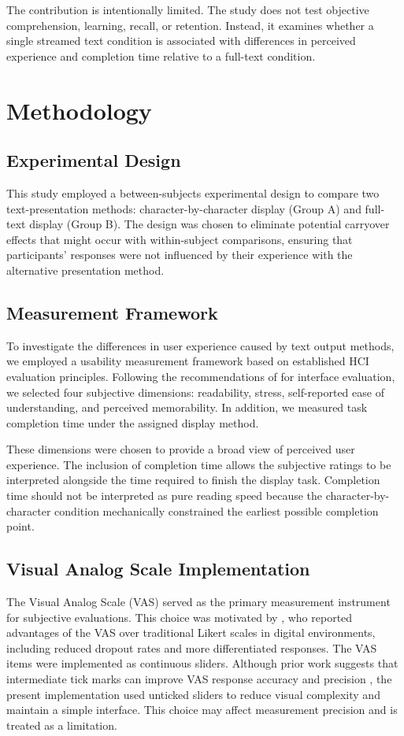 \documentclass[authoryear]{elsarticle}
\begin{document}
The contribution is intentionally limited. The study does not test objective comprehension, learning, recall, or retention. Instead, it examines whether a single streamed text condition is associated with differences in perceived experience and completion time relative to a full-text condition.

\section{Methodology}
\subsection{Experimental Design}
This study employed a between-subjects experimental design to compare two text-presentation methods: character-by-character display (Group A) and full-text display (Group B). The design was chosen to eliminate potential carryover effects that might occur with within-subject comparisons, ensuring that participants' responses were not influenced by their experience with the alternative presentation method.

\subsection{Measurement Framework}
To investigate the differences in user experience caused by text output methods, we employed a usability measurement framework based on established HCI evaluation principles. Following the recommendations of \citet{khashe2023} for interface evaluation, we selected four subjective dimensions: readability, stress, self-reported ease of understanding, and perceived memorability. In addition, we measured task completion time under the assigned display method.

These dimensions were chosen to provide a broad view of perceived user experience. The inclusion of completion time allows the subjective ratings to be interpreted alongside the time required to finish the display task. Completion time should not be interpreted as pure reading speed because the character-by-character condition mechanically constrained the earliest possible completion point.

\subsection{Visual Analog Scale Implementation}
The Visual Analog Scale (VAS) served as the primary measurement instrument for subjective evaluations. This choice was motivated by \citet{kuhlmann2016}, who reported advantages of the VAS over traditional Likert scales in digital environments, including reduced dropout rates and more differentiated responses. The VAS items were implemented as continuous sliders. Although prior work suggests that intermediate tick marks can improve VAS response accuracy and precision \citep{garcia-perez2023}, the present implementation used unticked sliders to reduce visual complexity and maintain a simple interface. This choice may affect measurement precision and is treated as a limitation.
\end{document}
